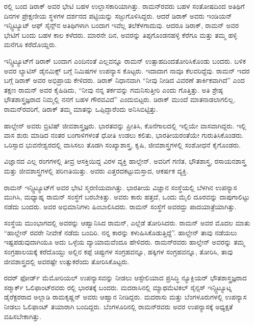 
ರಲ್ಲಿ ಬಂದ ಡಿರಾಕ್ ಅವರ ಭೇಟಿ ಬಹಳ ಉಲ್ಲಾಸಕಾರಿಯಾಗಿತ್ತು. ರಾಮನ್‍ರವರು ಬಹಳ ಸಂತೋಷದಿಂದ ಅತಿಥಿಗೆ \enginline{-}ದಿನಗಳ ಪ್ರೇಕ್ಷಣೀಯ ಸ್ಥಳಗಳ ದರ್ಶನದ ಪಟ್ಟಿಯನ್ನು ಸಜ್ಜುಗೊಳಿಸಿದ್ದರು. ಆದರೆ ಡಿರಾಕ್ ಅವರು ಇಂಡಿಯನ್ ಇನ್ಸ್ಟಿಟ್ಯೂಟ್ ಆಫ್ ಸೈನ್ಸ್‌ನ ಅತಿಥಿಗಳಾಗಿ ಬಂದಾಗ ಇವೆಲ್ಲ ತಲೆಕೆಳಗಾದುವು. ಆದರೂ ಡಿರಾಕ್, ರಾಮನ್ ಅವರ ಭೇಟಿಗೆ ಬಂದು ಬಹಳ ಕಾಲ ಕಳೆದರು. ಮಾರನೇ ದಿನ, ಅವರನ್ನು ತಿಪ್ಪಗೊಂಡನಹಳ್ಳಿ ಕೆರೆಗೂ ಮತ್ತು ತಮ್ಮ ಹಳ್ಳಿ ಮನೆಗೂ ಕರೆದೊಯ್ದರು.

ಇನ್ಸ್ಟಿಟ್ಯೂಟ್‍ಗೆ ಡಿರಾಕ್ ಬಂದಾಗ ಎಂದಿನಂತೆ ಎಲ್ಲವನ್ನೂ ರಾಮನ್ ಉತ್ಸಾಹದಿಂದ\break ತೋರಿಸಿಕೊಂಡು ಬಂದರು. ಬಳಿಕ ಅವರ ಲ್ಯಾಟಿಸ್ ಡೈನಮಿಕ್ಸ್ ಬಗ್ಗೆ  ನಿಮಿಷಗಳ ಉಪನ್ಯಾಸ ಕೊಟ್ಟರು. ಇದಾದಾಗ ನಾವೂ ಕೆಲವರಿದ್ದೆವು. ರಾಮನ್ ಇದರ ಬಗ್ಗೆ ಡಿರಾಕ್ ಅವರ ಅಭಿಪ್ರಾಯ ಕೇಳಿದರು. ಡಿರಾಕ್ ನಿಧಾನವಾಗಿ “ನೀವು ನೀಡಿದ ವಿವರಣೆ ತಾರ್ಕಿಕವಾಗಿದೆ” ಎಂದ ತಕ್ಷಣ ರಾಮನ್ ಅವರ ಕೈಹಿಡಿದು, “ನೀವು ನನ್ನ ತರ್ಕವನ್ನು ಗಮನಿಸುತ್ತೀರಿ ಎಂದು ಗೊತ್ತಿತ್ತು. ಅತಿ ಶ್ರೇಷ್ಠ ಭೌತಶಾಸ್ತ್ರಜ್ಞರಾದ ನಿಮ್ಮಲ್ಲಿ ನನಗೆ ಬಹಳ ಗೌರವವಿದೆ” ಎಂದುಬಿಟ್ಟರು. ಡಿರಾಕ್ ಮುಂದೆ ಮಾತನಾಡಲಾಗಲಿಲ್ಲ. ರಾಮನ್‍ರವರಿಗೆ, ಡಿರಾಕ್ ತಮ್ಮ ಮಾತನ್ನು ಒಪ್ಪಿದ್ದಾರೆಂದು ಅನಿಸಿಬಿಟ್ಟಿತ್ತು.



ಹಾಲ್ಡೇನ್ ಅವರು ಬ್ರಿಟಿಷ್ ಜೀವಶಾಸ್ತ್ರಜ್ಞರು. ಭಾರತವನ್ನು ಪ್ರೀತಿಸಿ, ಕೊನೆಗಾಲದಲ್ಲಿ ಇಲ್ಲಿಯೇ ವಾಸವಾಗಿದ್ದರು. ಇಲ್ಲಿ ವಾಸ ಶುರು ಮಾಡಿದ ನಂತರ ಬಂಗಾಳಿಗಳಂತೆ ಧೋತಿ ಉಡಲು ಕಲಿತು, ಭಾರತೀಯರಂತೆಯೇ ಗುರುತಿಸಿಕೊಂಡರು. ಒರಿಸ್ಸಾದ ಭುವನೇಶ್ವರದಲ್ಲಿ ವಾಸಿಸಲು ತೊಡಗಿ ಸಂಖ್ಯಾಶಾಸ್ತ್ರ, ಕೃಷಿ, ಜೀವಶಾಸ್ತ್ರಗಳಲ್ಲಿ ಸಂಶೋಧನೆ ಕೈಗೊಂಡರು.

ವಿಜ್ಞಾನದ ಎಲ್ಲ ರಂಗಗಳಲ್ಲಿ ತೀವ್ರ ಆಸಕ್ತಿಯಿದ್ದ ವಿರಳ ವ್ಯಕ್ತಿ ಹಾಲ್ಡೇನ್. ಅವರಿಗೆ ಗಣಿತ, ಭೌತಶಾಸ್ತ್ರ, ರಸಾಯನಶಾಸ್ತ್ರ ಮತ್ತು ಜೀವಶಾಸ್ತ್ರಗಳಲ್ಲಿ ಪರಿಣತಿಯಿತ್ತು. ಅವರು ಎತ್ತರದ\break ಕಟ್ಟುಮಸ್ತಾದ, ಆಕರ್ಷಕ ವ್ಯಕ್ತಿ.

ರಾಮನ್ ಇನ್ಸ್ಟಿಟ್ಯೂಟ್‍ಗೆ ಅವರ ಭೇಟಿ ಸ್ಮರಣಿಯವಾಗಿತ್ತು. ಭಾರತೀಯ ವಿಜ್ಞಾನ ಸಂಸ್ಥೆಯಲ್ಲಿ ಬೆಳಗಿನ ಉಪನ್ಯಾಸ ಮುಗಿಸಿ, ಮಧ್ಯಾಹ್ನ ರಾಮನ್ ಸಂಸ್ಥೆಗೆ ಬರಬೇಕಿತ್ತು. ಅವರು ಕಾರು ಹತ್ತದೆ, ಒಂದು ಮೈಲಿ ದೂರವನ್ನು ದಾಪುಗಾಲಿಟ್ಟು ನಡೆದು ಬಂದರು. ಅವರ ಅಭಿಮಾನಿಗಳು ಹಿಂಬಾಲಿಸಿದರು. ರಾಮನ್ ಸಂಸ್ಥೆಗೆ ಅವರದ್ದು ಪಾದಯಾತ್ರೆಯಾಗಿತ್ತು.

ಸಂಸ್ಥೆಯ ಮುಂಭಾಗದಲ್ಲಿ ಅವರನ್ನು ಆಹ್ವಾನಿಸಿದ ರಾಮನ್, ಎಲ್ಲೆಡೆ ತೋರಿಸಿದರು. ರಾಮನ್ ಅವರ ಮೊದಲ ಮಾತು “ಹಾಲ್ಡೇನ್ ರವರೇ ನೀವೇಕೆ ನಡೆದು ಬಂದಿರಿ. ನನ್ನ ಕಾರನ್ನು ಕಳುಹಿಸಿಕೊಡುತ್ತಿದ್ದೆ”. ಹಾಲ್ಡೇನ್ ತಾವು ನಡೆಯಲು ಇಷ್ಟಪಡುವುದಾಗಿಯೂ ಅದು ಒಳ್ಳೆಯ ವ್ಯಾಯಾಮವೆಂದೂ ಹೇಳಿದರು. ರಾಮನ್‍ರವರು ಹಾಲ್ಡೇನ್ ಅವರನ್ನು ತಮ್ಮ ಸಂಗ್ರಹಾಲಯಕ್ಕೆ ಕರೆದೊಯ್ದು ಅಲ್ಲಿನ ಕಪ್ಪೆ ಚಿಪ್ಪುಗಳ ಸಂಗ್ರಹವನ್ನೂ, ಹಕ್ಕಿಗಳ ಸಂಗ್ರಹವನ್ನೂ, ತೋರಿಸಿ, ತಾವು ಜೀವಶಾಸ್ತ್ರದಲ್ಲಿ ಅವರಷ್ಟೇ ಉತ್ಸುಕರೆಂದು ತೋರಿಸಿಕೊಟ್ಟರು.



ರದರ್ ಫೋರ್ಡ್ ಮೆಮೋರಿಯಲ್ ಉಪನ್ಯಾಸವನ್ನು ನೀಡಲು ಆಸ್ಟೇಲಿಯಾದ ಪ್ರಸಿದ್ಧಿ ನ್ಯೂಕ್ಲಿಯರ್ ಭೌತಶಾಸ್ತ್ರಜ್ಞರಾದ ಸರ್‍ಮಾರ್ಕ್ ಓಲಿಫಾಂಟ್‍ರವರು ರಲ್ಲಿ ಭಾರತಕ್ಕೆ ಬಂದರು. ಮದರಾಸಿನಲ್ಲಿ ಮ್ಯಾಥಮೆಟಿಕಲ್ ಸೈನ್ಸಸ್ ಇನ್ಸ್ಟಿಟ್ಯೂಟ್ನ ಡೈರೆಕ್ಟರರಾದ ಅಲ್ಲಾಡಿ ರಾಮಕೃಷ್ಣನ್ ಅವರು ಆಹ್ವಾನ ನೀಡಿದ್ದರು. ಮದರಾಸು ಮತ್ತು ಬೆಂಗಳೂರುಗಳಲ್ಲಿ ಉಪನ್ಯಾಸ ನೀಡಲು ಓಲಿಫಾಂಟ್ ತಯಾರಾಗಿ ಬಂದಿದ್ದರು. ಬೆಂಗಳೂರಿನಲ್ಲಿ ರಾಮನ್‍ರವರು ಅವರ ಉಪನ್ಯಾಸಕ್ಕೆ ಅಧ್ಯಕ್ಷತೆ ವಹಿಸಬೇಕಾಗಿತ್ತು.

